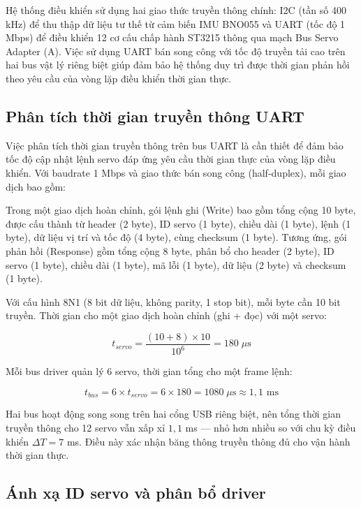 Hệ thống điều khiển sử dụng hai giao thức truyền thông chính: I2C (tần số 400 kHz) để thu thập dữ liệu tư thế từ cảm biến IMU BNO055 và UART (tốc độ 1 Mbps) để điều khiển 12 cơ cấu chấp hành ST3215 thông qua mạch Bus Servo Adapter (A). Việc sử dụng UART bán song công với tốc độ truyền tải cao trên hai bus vật lý riêng biệt giúp đảm bảo hệ thống duy trì được thời gian phản hồi theo yêu cầu của vòng lặp điều khiển thời gian thực.

\subsection{Phân tích thời gian truyền thông UART}

Việc phân tích thời gian truyền thông trên bus UART là cần thiết để đảm bảo tốc độ cập nhật lệnh servo đáp ứng yêu cầu thời gian thực của vòng lặp điều khiển. Với baudrate 1 Mbps và giao thức bán song công (half-duplex), mỗi giao dịch bao gồm:

Trong một giao dịch hoàn chỉnh, gói lệnh ghi (Write) bao gồm tổng cộng 10 byte, được cấu thành từ header (2 byte), ID servo (1 byte), chiều dài (1 byte), lệnh (1 byte), dữ liệu vị trí và tốc độ (4 byte), cùng checksum (1 byte). Tương ứng, gói phản hồi (Response) gồm tổng cộng 8 byte, phân bổ cho header (2 byte), ID servo (1 byte), chiều dài (1 byte), mã lỗi (1 byte), dữ liệu (2 byte) và checksum (1 byte).

Với cấu hình 8N1 (8 bit dữ liệu, không parity, 1 stop bit), mỗi byte cần 10 bit truyền. Thời gian cho một giao dịch hoàn chỉnh (ghi + đọc) với một servo:

\begin{equation}
    t_{servo} = \frac{(10 + 8) \times 10}{10^6} = 180 \; \mu\text{s}
\end{equation}

Mỗi bus driver quản lý 6 servo, thời gian tổng cho một frame lệnh:

\begin{equation}
    t_{bus} = 6 \times t_{servo} = 6 \times 180 = 1080 \; \mu\text{s} \approx 1{,}1 \text{ ms}
\end{equation}

Hai bus hoạt động song song trên hai cổng USB riêng biệt, nên tổng thời gian truyền thông cho 12 servo vẫn xấp xỉ $1{,}1$ ms --- nhỏ hơn nhiều so với chu kỳ điều khiển $\Delta T = 7$ ms. Điều này xác nhận băng thông truyền thông đủ cho vận hành thời gian thực.

\subsection{Ánh xạ ID servo và phân bổ driver}

